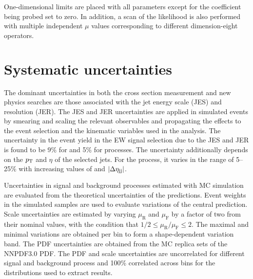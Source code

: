 One-dimensional limits are placed with all
parameters except for the coefficient being probed set to zero.
In addition, a scan of the likelihood is also performed with multiple independent
$\mu$ values corresponding to different dimension-eight operators. 

\section{Systematic uncertainties}
\label{sec:systematics}

The dominant uncertainties in both the cross section measurement 
and new physics searches are those associated with 
the jet energy scale (JES) and resolution (JER).  The JES and JER 
uncertainties are applied in simulated events by smearing and 
scaling the relevant
observables and propagating the effects to the event selection and 
the kinematic variables used in the analysis.
The uncertainty in the event yield in the EW signal selection
due to the JES and JER 
is found to be 9\% for \QCDWZ and 5\% for \EWWZ processes.
The uncertainty additionally depends on the $p_{\mathrm{T}}$ and $\eta$ of the selected
jets. For the \QCDWZ process, it varies in the range of 5--25\% with
increasing values of {\mjj} and $\left|\Delta\eta_{\mathrm{jj}}\right|$.

Uncertainties in signal and background processes estimated with
MC simulation are evaluated from the theoretical uncertainties 
of the predictions. 
Event weights in the simulated samples are used to evaluate 
variations of the central prediction.
Scale uncertainties are estimated by varying
$\mu_{\mathrm{R}}$ and $\mu_{\mathrm{F}}$ by a factor of two from their
nominal values, with the condition that $1/2 \le \mu_{\mathrm{R}}/\mu_{\mathrm{F}} \le 2$.
The maximal and minimal variations are obtained
per bin to form a shape-dependent variation band.
The PDF uncertainties are obtained from the MC replica sets 
of the NNPDF3.0 PDF. 
The PDF and scale uncertainties are uncorrelated for different signal and
background process and 100\% correlated across bins for the distributions
used to extract results.

